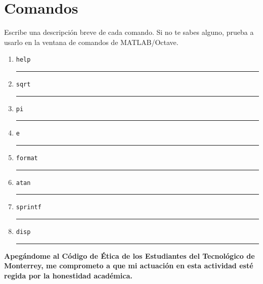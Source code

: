 \documentclass[spanish, 10pt]{article}
\newcommand{\responserule}{{\large\rule{14 cm}{0.3mm}}}
\newcommand{\matlab}[1]{\lstinline[style=Matlab-pyglike]!#1!}
\begin{document}
\section{Comandos}

Escribe una descripción breve de cada comando. Si no te sabes alguno, prueba a usarlo en la ventana de comandos de MATLAB/Octave.

\vspace{3ex}

\begin{enumerate}[label=\alph*)]
	\large
	\item \matlab{help} \\[3ex] \responserule
	\item \matlab{sqrt} \\[3ex] \responserule
	\item \matlab{pi} \\[3ex] \responserule
	\item \matlab{e} \\[3ex] \responserule
	\item \matlab{format} \\[3ex] \responserule
	\item \matlab{atan} \\[3ex] \responserule
	\item \matlab{sprintf} \\[3ex] \responserule
	\item \matlab{disp} \\[3ex] \responserule
\end{enumerate}

\vfill

\textbf{Apegándome al Código de Ética de los Estudiantes del Tecnológico de Monterrey, me comprometo a que mi actuación en esta actividad esté regida por la honestidad académica.}
\end{document}
